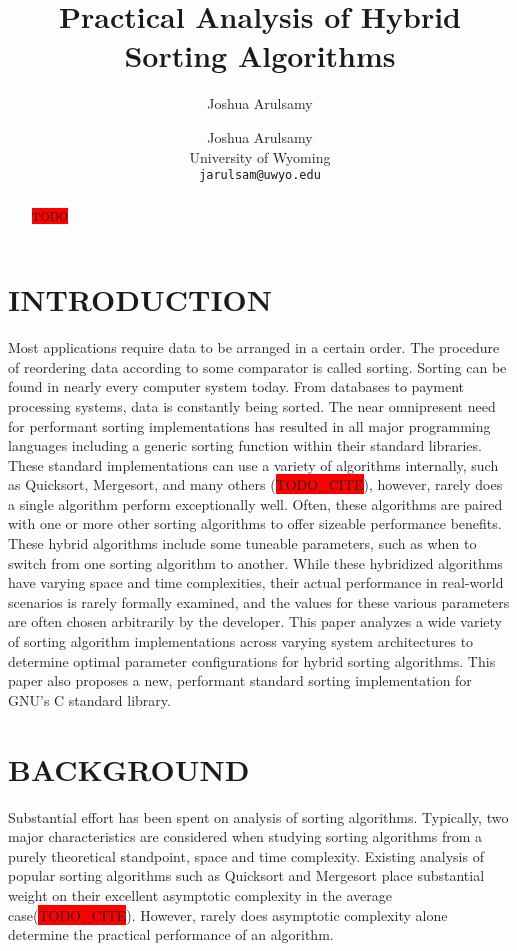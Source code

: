 \documentclass[letter, 12pt, conference]{ieeeconf}
\title{\LARGE \bf Practical Analysis of Hybrid Sorting Algorithms}
\author{Joshua Arulsamy}
\author{\parbox{3 in}{
	\centering
	Joshua Arulsamy\\
    University of Wyoming\\
    {\tt\small jarulsam@uwyo.edu}}}
\newcommand{\todo}{\colorbox{red}{TODO}}
\newcommand{\todocite}{\colorbox{red}{TODO\_CITE}}
\begin{document}
\maketitle
\thispagestyle{plain}
\pagestyle{plain}
\nocite{*}

\begin{abstract}

  \todo

\end{abstract}

\section{INTRODUCTION}

Most applications require data to be arranged in a certain order. The procedure
of reordering data according to some comparator is called sorting. Sorting can
be found in nearly every computer system today. From databases to payment
processing systems, data is constantly being sorted. The near omnipresent need
for performant sorting implementations has resulted in all major programming
languages including a generic sorting function within their standard libraries.
These standard implementations can use a variety of algorithms internally, such
as Quicksort, Mergesort, and many others (\todocite), however, rarely does a
single algorithm perform exceptionally well. Often, these algorithms are paired
with one or more other sorting algorithms to offer sizeable performance
benefits. These hybrid algorithms include some tuneable parameters, such as when
to switch from one sorting algorithm to another. While these hybridized
algorithms have varying space and time complexities, their actual performance in
real-world scenarios is rarely formally examined, and the values for these
various parameters are often chosen arbitrarily by the developer. This paper
analyzes a wide variety of sorting algorithm implementations across varying
system architectures to determine optimal parameter configurations for hybrid
sorting algorithms. This paper also proposes a new, performant standard sorting
implementation for GNU's C standard library.

\section{BACKGROUND}

Substantial effort has been spent on analysis of sorting algorithms. Typically,
two major characteristics are considered when studying sorting algorithms from a
purely theoretical standpoint, space and time complexity. Existing analysis of
popular sorting algorithms such as Quicksort and Mergesort place substantial
weight on their excellent asymptotic complexity in the average case(\todocite).
However, rarely does asymptotic complexity alone determine the practical
performance of an algorithm.
\end{document}
